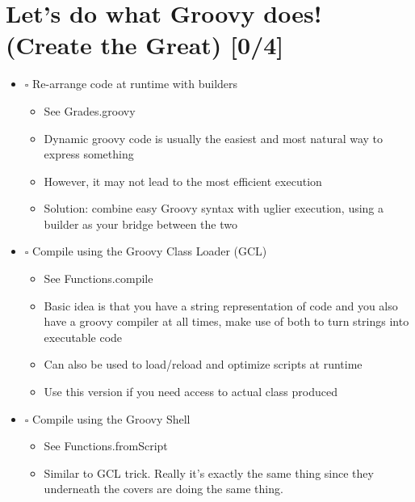 \documentclass[11pt]{article}
\begin{document}
\section{Let's do what Groovy does! (Create the Great) [0/4]}
\label{sec:orgheadline7}

\begin{itemize}
\item $\square$ Re-arrange code at runtime with builders

\begin{itemize}
\item See Grades.groovy

\item Dynamic groovy code is usually the easiest and most natural way to express something

\item However, it may not lead to the most efficient execution

\item Solution: combine easy Groovy syntax with uglier execution, using a builder as your bridge between the two
\end{itemize}

\item $\square$ Compile using the Groovy Class Loader (GCL)

\begin{itemize}
\item See Functions.compile

\item Basic idea is that you have a string representation of code and you also have a groovy compiler at all times, make use of both to turn strings into executable code

\item Can also be used to load/reload and optimize scripts at runtime

\item Use this version if you need access to actual class produced
\end{itemize}

\item $\square$ Compile using the Groovy Shell

\begin{itemize}
\item See Functions.fromScript

\item Similar to GCL trick. Really it's exactly the same thing since they underneath the covers are doing the same thing.


\end{itemize}
\end{itemize}
\end{document}
